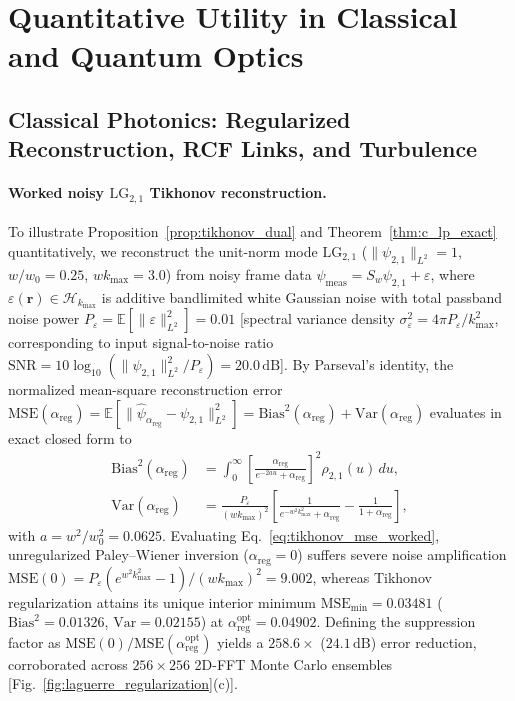 \documentclass[aps,pra,onecolumn,notitlepage,11pt,tightenlines,amsmath,amssymb,floatfix,longbibliography]{revtex4-2}
\providecommand{\norm}[1]{\lVert#1\rVert}
\begin{document}
\section{Quantitative Utility in Classical and Quantum Optics}
\label{sec:optics_utility}

\subsection{Classical Photonics: Regularized Reconstruction, RCF Links, and Turbulence}
\label{subsec:classical_utility}

\paragraph*{Worked noisy $\mathrm{LG}_{2,1}$ Tikhonov reconstruction.}
To illustrate Proposition~\ref{prop:tikhonov_dual} and Theorem~\ref{thm:c_lp_exact} quantitatively, we reconstruct the unit-norm mode $\mathrm{LG}_{2,1}$ ($\norm{\psi_{2,1}}_{L^2} = 1$, $w/w_0 = 0.25$, $w k_{\max} = 3.0$) from noisy frame data $\psi_{\mathrm{meas}} = S_w\psi_{2,1} + \varepsilon$, where $\varepsilon(\mathbf{r}) \in \mathcal{H}_{k_{\max}}$ is additive bandlimited white Gaussian noise with total passband noise power $P_\varepsilon = \mathbb{E}[\norm{\varepsilon}_{L^2}^2] = 0.01$ [spectral variance density $\sigma_\varepsilon^2 = 4\pi P_\varepsilon/k_{\max}^2$, corresponding to input signal-to-noise ratio $\mathrm{SNR} = 10\log_{10}(\norm{\psi_{2,1}}_{L^2}^2/P_\varepsilon) = 20.0\,\mathrm{dB}$]. By Parseval's identity, the normalized mean-square reconstruction error $\mathrm{MSE}(\alpha_{\mathrm{reg}}) = \mathbb{E}[\norm{\hat{\psi}_{\alpha_{\mathrm{reg}}} - \psi_{2,1}}_{L^2}^2] = \mathrm{Bias}^2(\alpha_{\mathrm{reg}}) + \mathrm{Var}(\alpha_{\mathrm{reg}})$ evaluates in exact closed form to
\begin{align}
\mathrm{Bias}^2(\alpha_{\mathrm{reg}}) &= \int_0^\infty \left[\frac{\alpha_{\mathrm{reg}}}{e^{-2au} + \alpha_{\mathrm{reg}}}\right]^2 \rho_{2,1}(u)\,du, \nonumber \\
\mathrm{Var}(\alpha_{\mathrm{reg}}) &= \frac{P_\varepsilon}{(w k_{\max})^2} \left[\frac{1}{e^{-w^2 k_{\max}^2} + \alpha_{\mathrm{reg}}} - \frac{1}{1 + \alpha_{\mathrm{reg}}}\right],
\label{eq:tikhonov_mse_worked}
\end{align}
with $a = w^2/w_0^2 = 0.0625$. Evaluating Eq.~\eqref{eq:tikhonov_mse_worked}, unregularized Paley--Wiener inversion ($\alpha_{\mathrm{reg}} = 0$) suffers severe noise amplification $\mathrm{MSE}(0) = P_\varepsilon (e^{w^2 k_{\max}^2} - 1)/(w k_{\max})^2 = 9.002$, whereas Tikhonov regularization attains its unique interior minimum $\mathrm{MSE}_{\min} = 0.03481$ ($\mathrm{Bias}^2 = 0.01326$, $\mathrm{Var} = 0.02155$) at $\alpha_{\mathrm{reg}}^{\mathrm{opt}} = 0.04902$. Defining the suppression factor as $\mathrm{MSE}(0)/\mathrm{MSE}(\alpha_{\mathrm{reg}}^{\mathrm{opt}})$ yields a $258.6\times$ ($24.1\,\mathrm{dB}$) error reduction, corroborated across $256\times 256$ 2D-FFT Monte Carlo ensembles [Fig.~\ref{fig:laguerre_regularization}(c)].
\end{document}
